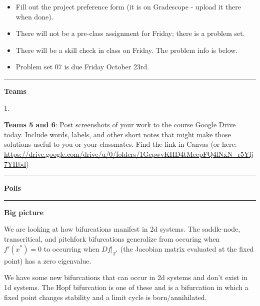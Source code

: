 \documentclass[12pt,letterpaper,noanswers]{exam}
\begin{document}
 \pdfpageheight 11in 
  \pdfpagewidth 8.5in

\noindent 




\begin{itemize}

   
    \item Fill out the project preference form (it is on Gradescope - upload it there when done). 
    \item There will not be a pre-class assignment for Friday; there is a problem set.
    \item There will be a skill check in class on Friday.  The problem info is below.
 \item Problem set 07 is due Friday October 23rd.
\end{itemize}

\hrule
\vspace{0.2cm}



\noindent\textbf{Teams}

\begin{multicols}{2}
1. 

\end{multicols}

\noindent \textbf{Teams 5 and 6}: Post screenshots of your work to the course Google Drive today.  Include words, labels, and other short notes that might make those solutions useful to you or your classmates.  Find the link in Canvas (or here: \url{https://drive.google.com/drive/u/0/folders/1GcpwvKHD4tMecpFQ4lNxN_r5Ylj7YHbd})

\vspace{0.2cm}

\hrule
\vspace{0.2cm}

\noindent\textbf{Polls}


\vspace{0.2cm}

\hrule
\vspace{0.2cm}

\noindent\textbf{Big picture}

We are looking at how bifurcations manifest in 2d systems.  The saddle-node, transcritical, and pitchfork bifurcations generalize from occuring when $f'(x^*) = 0$ to occurring when $\left.Df\right\vert_{\underline x^*}$ (the Jacobian matrix evaluated at the fixed point) has a zero eigenvalue.

We have some new bifurcations that can occur in 2d systems and don't exist in 1d systems.  The Hopf bifurcation is one of these and is a bifurcation in which a fixed point changes stability and a limit cycle is born/annihilated.  
\end{document}
